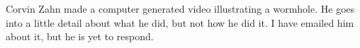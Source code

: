 \documentclass[12pt]{amsart}
\begin{document}





Corvin Zahn made a computer generated video illustrating a wormhole. He goes into a little detail about what he did, but not how he did it. I have emailed him about it, but he is yet to respond. \cite{spacetimetravel}






\end{document}
